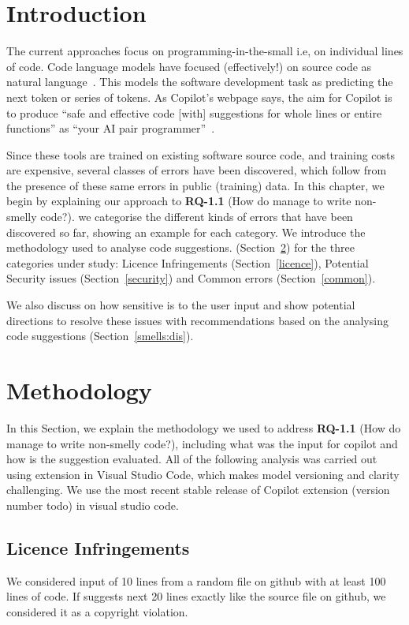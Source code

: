 \label{chapter:smells}

\section{Introduction}
The current approaches focus on programming-in-the-small \cite{DeRemer1976} i.e, on individual lines of code. 
Code language models have focused (effectively!) on source code as natural language~\cite{natural}.
This models the software development task as predicting the next token or series of tokens.
As Copilot's webpage says, the aim for Copilot is to produce ``safe and effective code [with] suggestions for whole lines or entire functions'' as ``your AI pair programmer''~\cite{Copilot-web}. 

Since these tools are trained on existing software source code, and training costs are expensive, several classes of errors have been discovered, which follow from the presence of these same errors in public (training) data. In this chapter, we begin by explaining our approach to \textbf{RQ-1.1} (How do \cct{} manage to write non-smelly code?). we categorise the different kinds of errors that have been discovered so far, showing an example for each category. 
We introduce the methodology used to analyse \cop{} code suggestions. (Section~\ref{method}) for the three categories under study: Licence Infringements (Section~\ref{licence}), Potential Security issues (Section~\ref{security}) and Common errors (Section~\ref{common}).

We also discuss on how sensitive \cop{} is to the user input and show potential directions to resolve these issues with recommendations based on the analysing \cop{} code suggestions (Section~\ref{smells:dis}).

\section{Methodology}
\label{method}
In this Section, we explain the methodology we used to address \textbf{RQ-1.1} (How do \cct{} manage to write non-smelly code?), including what was the input for copilot and how is the suggestion evaluated. All of the following analysis was carried out using \cop{} extension in Visual Studio Code, which makes \cop{} model versioning and clarity challenging. We use the most recent stable release of Copilot extension (version number todo) in visual studio code. 

\subsection{Licence Infringements}
We considered input of 10 lines from a random file on github with at least 100 lines of code. If \cop{} suggests next 20 lines exactly like the source file on github, we considered it as a copyright violation. 

